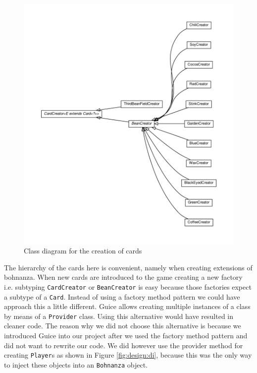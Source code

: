 \begin{figure}[h!]
    \includegraphics[width=\textwidth]{../umlgraph/CreatorGraph}
    \caption{Class diagram for the creation of cards}
    \label{fig:design:creator}
\end{figure}

The hierarchy of the cards here is convenient, namely when creating extensions of bohnanza. When new cards are introduced to the game
creating a new factory i.e. subtyping \texttt{CardCreator} or \texttt{BeanCreator} is easy because those factories expect a subtype of a
\texttt{Card}. Instead of using a factory method pattern we could have approach this a little different. Guice allows creating multiple
instances of a class by means of a \texttt{Provider} class. Using this alternative would have resulted in cleaner code. The reason why we
did not choose this alternative is because we introduced Guice into our project after we used the factory method pattern and did not want to
rewrite our code. We did however use the provider method for creating \texttt{Player}s as shown in Figure \ref{fig:design:di}, because this
was the only way to inject these objects into an \texttt{Bohnanza} object.

